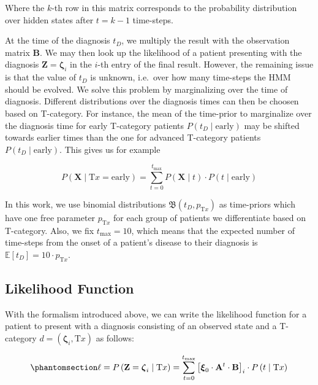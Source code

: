 \documentclass[
  sn-mathphys-num,
]{sn-jnl}
\begin{document}
Where the \(k\)-th row in this matrix corresponds to the probability
distribution over hidden states after \(t=k-1\) time-steps.

At the time of the diagnosis \(t_D\), we multiply the result with the
observation matrix \(\mathbf{B}\). We may then look up the likelihood of
a patient presenting with the diagnosis
\(\mathbf{Z}=\boldsymbol{\zeta}_i\) in the \(i\)-th entry of the final
result. However, the remaining issue is that the value of \(t_D\) is
unknown, i.e.~over how many time-steps the HMM should be evolved. We
solve this problem by marginalizing over the time of diagnosis.
Different distributions over the diagnosis times can then be choosen
based on T-category. For instance, the mean of the time-prior to
marginalize over the diagnosis time for early T-category patients
\(P\left( t_D \mid \text{early} \right)\) may be shifted towards earlier
times than the one for advanced T-category patients
\(P\left( t_D \mid \text{early} \right)\). This gives us for example

\[
P\left( \mathbf{X} \mid \text{T}x = \text{early} \right) = \sum_{t=0}^{t_\text{max}} P \left( \mathbf{X} \mid t \right) \cdot P(t \mid \text{early})
\]

In this work, we use binomial distributions
\(\mathfrak{B} \left( t_D, p_{\text{T}x} \right)\) as time-priors which
have one free parameter \(p_{\text{T}x}\) for each group of patients we
differentiate based on T-category. Also, we fix \(t_\text{max} = 10\),
which means that the expected number of time-steps from the onset of a
patient's disease to their diagnosis is
\(\mathbb{E}\left[ t_D \right] = 10 \cdot p_{\text{T}x}\).

\subsection{Likelihood Function}\label{likelihood-function}

With the formalism introduced above, we can write the likelihood
function for a patient to present with a diagnosis consisting of an
observed state and a T-category
\(d = \left( \boldsymbol{\zeta}_i, \text{T}x \right)\) as follows:

\begin{equation}\phantomsection\label{eq-single-patient-llh}{
\ell = P \left( \mathbf{Z} = \boldsymbol{\zeta}_i \mid \text{T}x \right) = \sum_{t=0}^{t_\text{max}} \left[ \boldsymbol{\xi}_0 \cdot \mathbf{A}^t \cdot \mathbf{B} \right]_i \cdot P \left( t \mid \text{T}x \right)
}\end{equation}
\end{document}
